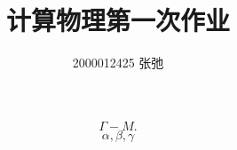 \documentclass[10pt]{ctexart}
\author{2000012425 张弛}
\title{计算物理第一次作业}
\begin{document}
\maketitle
$$\Gamma-M.$$
$$\alpha,\beta,\gamma$$
\end{document}
